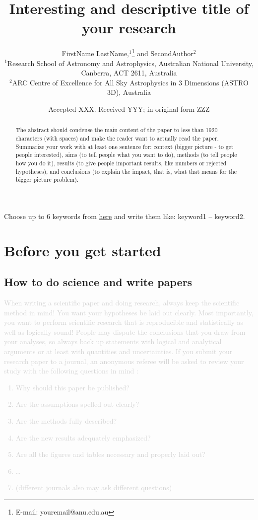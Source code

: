 \documentclass[fleqn,usenatbib]{mnras}
\title[Short Title]{Interesting and descriptive title of your research}
\author[F. Author et al.]{FirstName LastName,$^{1}$\thanks{E-mail: youremail@anu.edu.au}
and SecondAuthor$^{2}$
\\
$^{1}$Research School of Astronomy and Astrophysics, Australian National University, Canberra, ACT 2611, Australia\\
$^{2}$ARC Centre of Excellence for All Sky Astrophysics in 3 Dimensions (ASTRO 3D), Australia
}
\date{Accepted XXX. Received YYY; in original form ZZZ}
\newcommand{\comment}[1]{\textcolor{lightgray}{#1}}
\begin{document}
\label{firstpage}
\pagerange{\pageref{firstpage}--\pageref{lastpage}}
\maketitle

\begin{abstract}
The abstract should condense the main content of the paper to less than 1920 characters (with spaces) and make the reader want to actually read the paper. Summarize your work with at least one sentence for: context (bigger picture - to get people interested), aims (to tell people what you want to do), methods (to tell people how you do it), results (to give people important results, like numbers or rejected hypotheses), and conclusions (to explain the impact, that is, what that means for the bigger picture problem).
\end{abstract}

\begin{keywords}
Choose up to 6 keywords from \href{https://academic.oup.com/DocumentLibrary/mnras/keywords.pdf}{here} and write them like: keyword1 -- keyword2.
\end{keywords}

\section{Before you get started}

\subsection{How to do science and write papers}

\comment{When writing a scientific paper and doing research, always keep the scientific method in mind! You want your hypotheses be laid out clearly. Most importantly, you want to perform scientific research that is reproducible and statistically as well as logically sound! People may dispute the conclusions that you draw from your analyses, so always back up statements with logical and analytical arguments or at least with quantities and uncertainties. If you submit your research paper to a journal, an anonymous referee will be asked to review your study with the following questions in mind \citep{Bertout2004}:
\begin{enumerate}
    \item Why should this paper be published?
    \item Are the assumptions spelled out clearly?
    \item Are the methods fully described?
    \item Are the new results adequately emphasized?
    \item Are all the figures and tables necessary and properly laid out?
    \item \dots
    \item (different journals also may ask different questions)
\end{enumerate}}
\end{document}
